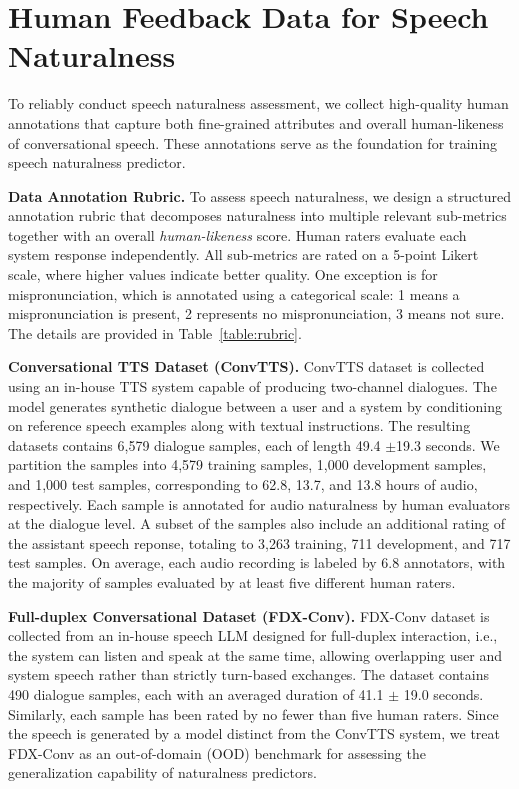 \section{Human Feedback Data for Speech Naturalness} \label{sec:human_data}


To reliably conduct speech naturalness assessment, we collect high-quality human annotations that capture both fine-grained attributes and overall human-likeness of conversational speech. These annotations serve as the foundation for training speech naturalness predictor.

\textbf{Data Annotation Rubric.}
To assess speech naturalness, we design a structured annotation rubric that decomposes naturalness into multiple relevant sub-metrics together with an overall \emph{human-likeness} score. Human raters evaluate each system response independently. All sub-metrics are rated on a 5-point Likert scale, where higher values indicate better quality. One exception is for mispronunciation, which is annotated using a categorical scale: 1 means a mispronunciation is present, 2 represents no mispronunciation, 3 means not sure. The details are provided in Table~\ref{table:rubric}.

\textbf{Conversational TTS Dataset (ConvTTS).}  
ConvTTS dataset is collected using an in-house TTS system capable of producing two-channel dialogues. The model generates synthetic dialogue between a user and a system by conditioning on reference speech examples along with textual instructions. The resulting datasets contains 6,579 dialogue samples, each of length 49.4 $\pm$19.3 seconds. We partition the samples into 4,579 training samples, 1,000 development samples, and 1,000 test samples, corresponding to 62.8, 13.7, and 13.8 hours of audio, respectively. Each sample is annotated for audio naturalness by human evaluators at the dialogue level. A subset of the samples also include an additional rating of the assistant speech reponse, totaling to 3,263 training, 711 development, and 717 test samples. On average, each audio recording is labeled by 6.8 annotators, with the majority of samples evaluated by at least five different human raters.

\textbf{Full-duplex Conversational Dataset (FDX-Conv).} 
FDX-Conv dataset is collected from an in-house speech LLM designed for full-duplex interaction, i.e., the system can listen and speak at the same time, allowing overlapping user and system speech rather than strictly turn-based exchanges. The dataset contains 490 dialogue samples, each with an averaged duration of 41.1 $\pm$ 19.0 seconds. Similarly, each sample has been rated by no fewer than five human raters. Since the speech is generated by a model distinct from the ConvTTS system, we treat FDX-Conv as an out-of-domain (OOD) benchmark for assessing the generalization capability of naturalness predictors.



